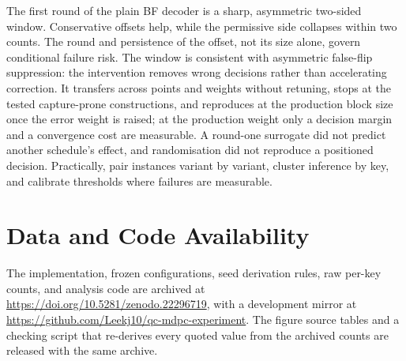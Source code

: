 \documentclass[runningheads,a4paper]{llncs}
\begin{document}
The first round of the plain BF decoder is a sharp, asymmetric two-sided window. Conservative offsets help, while the permissive side collapses within two counts. The round and persistence of the offset, not its size alone, govern conditional failure risk. The window is consistent with asymmetric false-flip suppression: the intervention removes wrong decisions rather than accelerating correction. It transfers across points and weights without retuning, stops at the tested capture-prone constructions, and reproduces at the production block size once the error weight is raised; at the production weight only a decision margin and a convergence cost are measurable. A round-one surrogate did not predict another schedule's effect, and randomisation did not reproduce a positioned decision. Practically, pair instances variant by variant, cluster inference by key, and calibrate thresholds where failures are measurable.
\section*{Data and Code Availability}
The implementation, frozen configurations, seed derivation rules, raw per-key counts, and analysis code are archived at \url{https://doi.org/10.5281/zenodo.22296719}, with a development mirror at \url{https://github.com/Leekj10/qc-mdpc-experiment}. The figure source tables and a checking script that re-derives every quoted value from the archived counts are released with the same archive.



\end{document}
